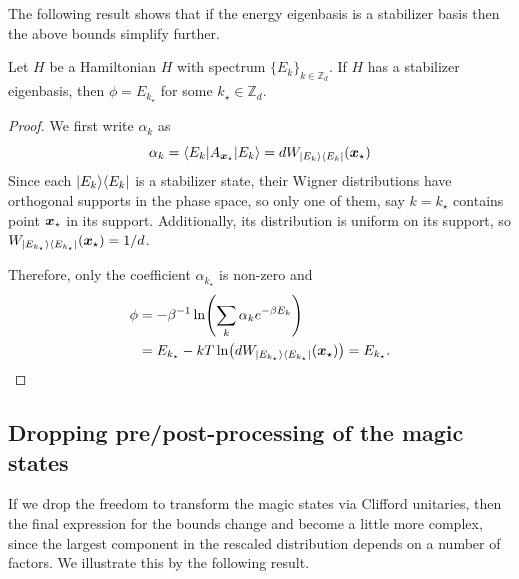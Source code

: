 \documentclass[pra,
aps,
twocolumn,
superscriptaddress,
groupedaddress,
nofootinbib,
reprint
]{revtex4-1}
\begin{document}
The following result shows that if the energy eigenbasis is a stabilizer basis then the above bounds simplify further.
\begin{proposition} \label{sharp-phi}
	Let $H$ be a Hamiltonian $H$ with spectrum $\{E_k\}_{k \in \mathbb{Z}_d}$.
	If $H$ has a stabilizer eigenbasis, then $\phi = E_{k_{\star}}$ for some $k_{\star} \in \mathbb{Z}_d$.
\end{proposition}
\begin{proof}
	We first write $\alpha_k$ as
\begin{equation}
	\alpha_k = \langle E_k | A_{\bm{x}_{\star}} |E_k\rangle = d W_{|E_k\rangle\langle E_k|}(\bm{x}_{\star})
\end{equation}
Since each $|E_k\rangle\langle E_k|$ is a stabilizer state, their Wigner distributions have orthogonal supports in the phase space, so only one of them, say $k = k_{\star}$ contains point $\bm{x}_{\star}$ in its support. 
Additionally, its distribution is uniform on its support, so $W_{|E_{k_\star}\rangle\langle E_{k_\star}|}(\bm{x}_{\star}) = 1/d$.

Therefore, only the coefficient $\alpha_{k_{\star}}$ is non-zero and
\begin{align}
\phi &= -\beta^{-1}\ln (\sum_k \alpha_k e^{-\beta E_k}) \nonumber \\
&=E_{k_{\star}} -kT \ln (d W_{|E_{k_\star}\rangle\langle E_{k_\star}|}(\bm{x}_{\star})) =E_{k_{\star}}.
\end{align}

\end{proof}

\subsection{Dropping pre/post-processing of the magic states}
\label{app:cliff_processing}

If we drop the freedom to transform the magic states via Clifford unitaries, then the final expression for the bounds change and become a little more complex, since the largest component in the rescaled distribution depends on a number of factors. We illustrate this by the following result.
\end{document}

